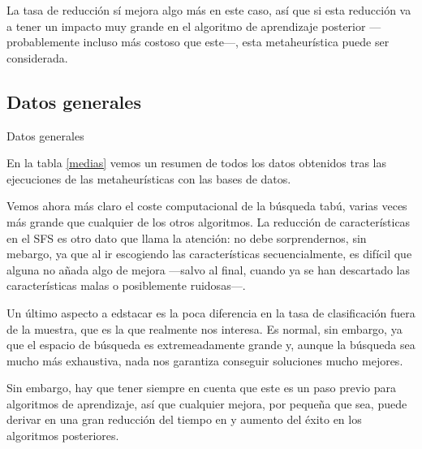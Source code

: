 \documentclass[a4paper, 11pt, titlepage]{article}
\begin{document}
    La tasa de reducción sí mejora algo más en este caso, así que si esta reducción va a tener un impacto muy grande en el algoritmo de aprendizaje posterior ---probablemente incluso más costoso que este---, esta metaheurística puede ser considerada.

    \subsection{Datos generales}
    \begin{table}[!htb]
        \maketablemean{\dataMedias}
        \caption{Datos generales}
        \label{medias}
    \end{table}

    En la tabla \ref{medias} vemos un resumen de todos los datos obtenidos tras las ejecuciones de las metaheurísticas con las bases de datos.

    Vemos ahora más claro el coste computacional de la búsqueda tabú, varias veces más grande que cualquier de los otros algoritmos. La reducción de características en el SFS es otro dato que llama la atención: no debe sorprendernos, sin mebargo, ya que al ir escogiendo las características secuencialmente, es difícil que alguna no añada algo de mejora ---salvo al final, cuando ya se han descartado las características malas o posiblemente ruidosas---.

    Un último aspecto a edstacar es la poca diferencia en la tasa de clasificación fuera de la muestra, que es la que realmente nos interesa. Es normal, sin embargo, ya que el espacio de búsqueda es extremeadamente grande y, aunque la búsqueda sea mucho más exhaustiva, nada nos garantiza conseguir soluciones mucho mejores.

    Sin embargo, hay que tener siempre en cuenta que este es un paso previo para algoritmos de aprendizaje, así que cualquier mejora, por pequeña que sea, puede derivar en una gran reducción del tiempo en y aumento del éxito en los algoritmos posteriores.
\end{document}
